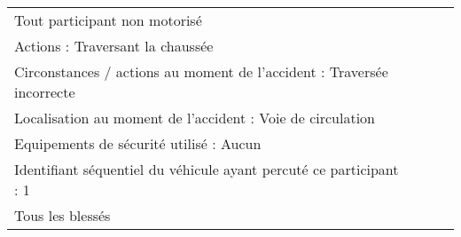 \documentclass[a4paper,12pt,twoside,french]{book}
[a4paper,12pt,twoside]
\begin{document}
\begin{landscape}
\begin{table}[]
\begin{adjustbox}{width=2.1\textwidth,center=\textwidth}
\begin{tabular}{|l|l|l|l|l|}
{\color[HTML]{196B24} Tout participant non motorisé}                                                                 &                                                             &                                                                                     &                                                                                    &  \\
Actions : Traversant la chaussée                                                                                     &                                                             &                                                                                     &                                                                                    &  \\
\multicolumn{2}{l}{Circonstances   / actions au moment de l'accident : Traversée incorrecte}                                                                                       &                                                                                     &                                                                                    &  \\
Localisation au moment de l'accident :   Voie de circulation                                                         &                                                             &                                                                                     &                                                                                    &  \\
Equipements de sécurité utilisé : Aucun                                                                              &                                                             &                                                                                     &                                                                                    &  \\
\multicolumn{2}{l}{Identifiant   séquentiel du véhicule ayant percuté ce participant : 1}                                                                                          &                                                                                     &                                                                                    &  \\
{\color[HTML]{196B24} Tous les blessés}                                                                              &                                                             &                                                                                     &                                                                                    &  \\

\end{tabular}
\end{adjustbox}
\end{table}
\end{landscape}
\end{document}
